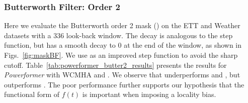 \subsubsection{Butterworth Filter: Order 2}
\label{sm:experiments_powerformer_butter2}


Here we evaluate the Butterworth order 2 mask (\fbwt) on the ETT and Weather datasets with a 336 look-back window.
The \fbwt{} decay is analogous to the step function, but has a smooth decay to 0 at the end of the window, as shown in Figs.~\ref{fig:maskBF}.
We use \fbwt{} as an improved step function to avoid the sharp cutoff.
Table~\ref{tab:powerformer_butter2_results} presents the results for \emph{Powerformer} with WCMHA and \fbwt.
We observe that \fbwt{} underperforms \fpl{} and \fspl, but outperforms \fbwo.
The poor performance further supports our hypothesis that the functional form of $f(t)$ is important when imposing a locality bias.

